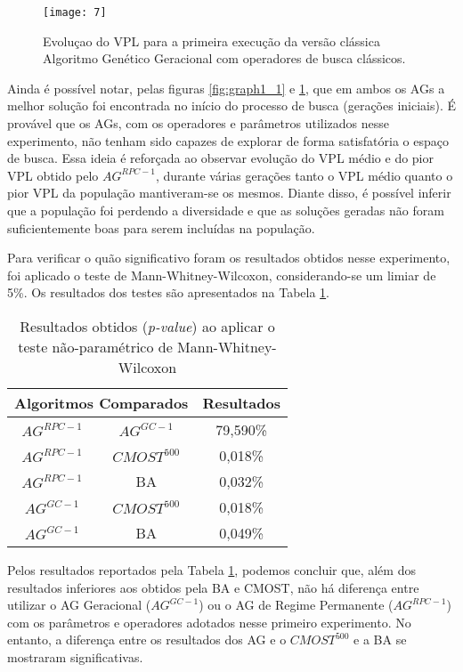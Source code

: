\begin{figure}[htb]
    \texttt{[image: 7]}
    \caption{Evoluçao do VPL para a primeira execução da versão clássica Algoritmo Genético Geracional com operadores de busca clássicos.}
    \label{fig:graph1_2}
\end{figure}

Ainda é possível notar, pelas figuras \ref{fig:graph1_1} e \ref{fig:graph1_2}, que em ambos os AGs a melhor solução foi encontrada no início do processo de busca (gerações iniciais). É provável que os AGs, com os operadores e parâmetros utilizados nesse experimento, não tenham sido capazes de explorar de forma satisfatória o espaço de busca. Essa ideia é reforçada ao observar evolução do VPL médio e do pior VPL obtido pelo $AG^{RPC-1}$, durante várias gerações tanto o VPL médio quanto o pior VPL da população mantiveram-se os mesmos. Diante disso, é possível inferir que a população foi perdendo a diversidade e que as soluções geradas não foram suficientemente boas para serem incluídas na população.

Para verificar o quão significativo foram os resultados obtidos nesse experimento, foi aplicado o teste de Mann-Whitney-Wilcoxon, considerando-se um limiar de 5\%. Os resultados dos testes são apresentados na Tabela \ref{tab:mw1_1}.

\begin{table}[H]
\centering
\caption{Resultados obtidos (\textit{p-value}) ao aplicar o teste não-paramétrico de Mann-Whitney-Wilcoxon}
\label{tab:mw1_1}
\begin{tabular}{|c|c|c|}
\hline
\multicolumn{2}{|c|}{Algoritmos Comparados} & Resultados \\ \hline
$AG^{RPC-1}$ &	$AG^{GC-1}$ & 79,590\% \\ \hline
$AG^{RPC-1}$ & $CMOST^{500}$ & 0,018\% \\ \hline
$AG^{RPC-1}$ & BA & 0,032\% \\ \hline
$AG^{GC-1}$ & $CMOST^{500}$ & 0,018\% \\ \hline
$AG^{GC-1}$ & BA & 0,049\% \\ \hline

\end{tabular}
\end{table}

Pelos resultados reportados pela Tabela \ref{tab:mw1_1}, podemos concluir que, além dos resultados inferiores aos obtidos pela BA e CMOST, não há diferença entre utilizar o AG Geracional ($AG^{GC-1}$) ou o AG de Regime Permanente ($AG^{RPC-1}$) com os parâmetros e operadores adotados nesse primeiro experimento. No entanto, a diferença entre os resultados dos AG e o $CMOST^{500}$ e a BA se mostraram  significativas.

